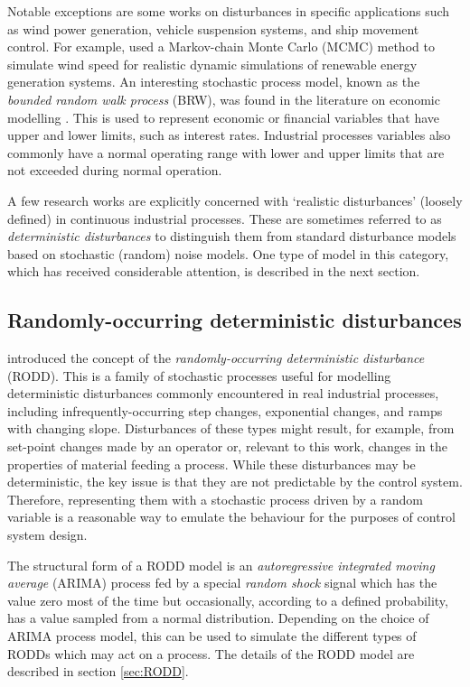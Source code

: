 Notable exceptions are some works on disturbances in specific applications such as wind power generation, vehicle suspension systems, and ship movement control. For example, \cite{papaefthymiou_mcmc_2008} used a Markov-chain Monte Carlo (MCMC) method to simulate wind speed for realistic dynamic simulations of renewable energy generation systems. An interesting stochastic process model, known as the \textit{bounded random walk process} (BRW), was found in the literature on economic modelling \citep{nicolau_stationary_2002}. This is used to represent economic or financial variables that have upper and lower limits, such as interest rates. Industrial processes variables also commonly have a normal operating range with lower and upper limits that are not exceeded during normal operation.

A few research works are explicitly concerned with `realistic disturbances' (loosely defined) in continuous industrial processes. These are sometimes referred to as \textit{deterministic disturbances} to distinguish them from standard disturbance models based on stochastic (random) noise models. One type of model in this category, which has received considerable attention, is described in the next section.

\subsection{Randomly-occurring deterministic disturbances} \label{RODDs}

\cite{macgregor_duality_1984} introduced the concept of the \textit{randomly-occurring deterministic disturbance} (RODD). This is a family of stochastic processes useful for modelling deterministic disturbances commonly encountered in real industrial processes, including  infrequently-occurring step changes, exponential changes, and ramps with changing slope. Disturbances of these types might result, for example, from set-point changes made by an operator or, relevant to this work, changes in the properties of material feeding a process. While these disturbances may be deterministic, the key issue is that they are not predictable by the control system. Therefore, representing them with a stochastic process driven by a random variable is a reasonable way to emulate the behaviour for the purposes of control system design.

The structural form of a RODD model is an \textit{autoregressive integrated moving average} (ARIMA) process fed by a special \textit{random shock} signal which has the value zero most of the time but occasionally, according to a defined probability, has a value sampled from a normal distribution. Depending on the choice of ARIMA process model, this can be used to simulate the different types of RODDs which may act on a process. The details of the RODD model are described in section \ref{sec:RODD}.

